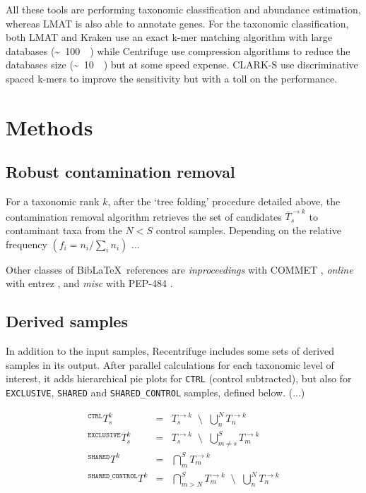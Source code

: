 \documentclass{GR}
\begin{document}
{All these tools are performing taxonomic classification and abundance estimation, whereas LMAT \parencite{LMAT, LMAT2} is also able to annotate genes. For the taxonomic classification, both LMAT and Kraken \parencite{kraken} use an exact k-mer matching algorithm with large databases (\SI{100}[\sim]{\gibi\byte}) while Centrifuge \parencite{centrifuge} use compression algorithms to reduce the databases size (\SI{10}[\sim]{\gibi\byte}) but at some speed expense. CLARK-S \parencite{CLARK-S} use discriminative spaced k-mers to improve the sensitivity but with a toll on the performance.


\section*{Methods}
\small
\subsection*{Robust contamination removal}
For a taxonomic rank $k$, after the `tree folding' procedure detailed above, the contamination removal algorithm retrieves the set of candidates $\bar{T}^{\rightarrow k}_s$ to contaminant taxa from the $N<S$ control samples. Depending on the relative frequency $\left(f_i=n_i/\sum_i n_i\right)$ ...

Other classes of Bib\LaTeX\ references are \emph{inproceedings} with COMMET \parencite{COMMET}, \emph{online} with entrez \parencite{entrez}, and \emph{misc} with PEP-484 \parencite{PEP484}. 

\subsection*{Derived samples}
In addition to the input samples, Recentrifuge includes some sets of derived samples in its output. After parallel calculations for each taxonomic level of interest, it adds hierarchical pie plots for {\tt CTRL} (control subtracted), but also for {\tt EXCLUSIVE}, {\tt SHARED} and {\tt SHARED\_CONTROL} samples, defined below. (...)

\begin{eqnarray*}
{}^{\mathtt{CTRL}}T_s^k &=& T^{\rightarrow k}_s \;\;\setminus\;\; \bigcup_{n}^N T_n^{\rightarrow k} \\
{}^{\mathtt{EXCLUSIVE}}T_s^k &=& T^{\rightarrow k}_s \;\;\setminus\;\; \bigcup_{m\neq s}^S T_m^{\rightarrow k} \\
{}^{\mathtt{SHARED}}T^k &=& \bigcap_{m}^S T_m^{\rightarrow k} \\
{}^{\mathtt{SHARED\_CONTROL}}T^k &=& \bigcap_{m>N}^S T_m^{\rightarrow k} \;\;\setminus\;\; \bigcup_{n}^N T_n^{\rightarrow k}
\end{eqnarray*}
\normalsize

}
\end{document}
